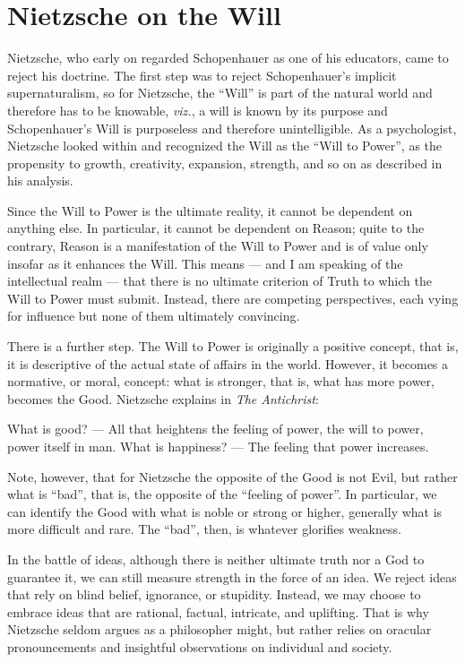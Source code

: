 \section{Nietzsche on the Will}

Nietzsche, who early on regarded Schopenhauer as one of his educators, came to reject his doctrine. The first step was to reject Schopenhauer's implicit supernaturalism, so for Nietzsche, the ``Will'' is part of the natural world and therefore has to be knowable, \emph{viz.}, a will is known by its purpose and Schopenhauer's Will is purposeless and therefore unintelligible. As a psychologist, Nietzsche looked within and recognized the Will as the ``Will to Power'', as the propensity to growth, creativity, expansion, strength, and so on as described in his analysis.

Since the Will to Power is the ultimate reality, it cannot be dependent on anything else. In particular, it cannot be dependent on Reason; quite to the contrary, Reason is a manifestation of the Will to Power and is of value only insofar as it enhances the Will. This means --- and I am speaking of the intellectual realm --- that there is no ultimate criterion of Truth to which the Will to Power must submit. Instead, there are competing perspectives, each vying for influence but none of them ultimately convincing.

There is a further step. The Will to Power is originally a positive concept, that is, it is descriptive of the actual state of affairs in the world. However, it becomes a normative, or moral, concept: what is stronger, that is, what has more power, becomes the Good. Nietzsche explains in \emph{The Antichrist}:

\begin{quotex}
What is good? --- All that heightens the feeling of power, the will to power, power itself in man. What is happiness? --- The feeling that power increases.
\end{quotex}


Note, however, that for Nietzsche the opposite of the Good is not Evil, but rather what is ``bad'', that is, the opposite of the ``feeling of power''. In particular, we can identify the Good with what is noble or strong or higher, generally what is more difficult and rare. The ``bad'', then, is whatever glorifies weakness.

In the battle of ideas, although there is neither ultimate truth nor a God to guarantee it, we can still measure strength in the force of an idea. We reject ideas that rely on blind belief, ignorance, or stupidity. Instead, we may choose to embrace ideas that are rational, factual, intricate, and uplifting. That is why Nietzsche seldom argues as a philosopher might, but rather relies on oracular pronouncements and insightful observations on individual and society.

